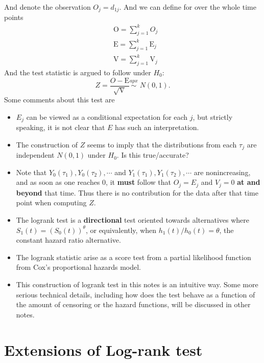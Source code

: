 \documentclass[a4paper,12pt]{article}
\begin{document}
And denote the observation $O_j = d_{1j}$. And we can define for over the whole time points
\[
  \begin{aligned}
    & \mathrm{O} = \sum\limits_{j = 1}^k O_j    \\
    & \mathrm{E} = \sum\limits_{j = 1}^k \mathrm{E}_j    \\
    & \mathrm{V} = \sum\limits_{j = 1}^k \mathrm{V}_j
  \end{aligned}
\]
And the test statistic is argued to follow under $H_0$:
\[
  Z = \frac{O - \mathrm{E}}{\sqrt{\mathrm{V}}}
  \overset{apx}{\sim}\; N\left(0, 1\right).
\]
Some comments about this test are
\begin{itemize}
\item $E_j$ can be viewed as a conditional expectation for each $j$, but strictly speaking, it is not clear that $E$ has such an interpretation. 
\item The construction of $Z$ seems to imply that the distributions from each $\tau_j$ are independent $N\left(0, 1\right)$ under $H_0$. Is this true/accurate?
\item Note that $Y_0\left(\tau_1\right), Y_0\left(\tau_2\right), \cdots$ and $Y_1\left(\tau_1\right), Y_1\left(\tau_2\right), \cdots$ are nonincreasing, and as soon as one reaches 0, it \textbf{must} follow that $O_j = E_j$ and $V_j = 0$ \textbf{at and beyond} that time. Thus there is no contribution for the data after that time point when computing $Z$.
\item The logrank test is a \textbf{directional} test oriented towards alternatives where $S_1\left(t\right) = \left(S_0\left(t\right)\right)^\theta$, or equivalently, when $h_1\left(t\right) / h_0\left(t\right) = \theta$, the constant hazard ratio alternative.
\item The logrank statistic arise as a score test from a partial likelihood function from Cox's proportional hazards model.
\item This construction of logrank test in this notes is an intuitive way. Some more serious technical details, including how does the test behave as a function of the amount of censoring or the hazard functions, will be discussed in other notes.
\end{itemize}


\section{Extensions of Log-rank test}
\label{sec:extensions-log-rank}
\end{document}
